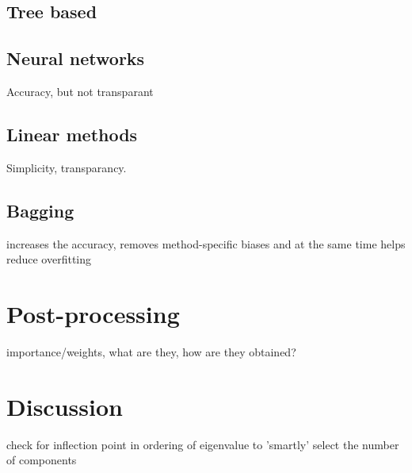 \documentclass[a4paper,10pt]{article}
\begin{document}
\subsection{Tree based}


\subsection{Neural networks}

Accuracy, but not transparant

\subsection{Linear methods}

Simplicity, transparancy.

\subsection{Bagging}

increases the accuracy, removes method-specific biases and at the same time helps reduce overfitting

\section{Post-processing}

importance/weights, what are they, how are they obtained?

\section{Discussion}

\begin{item}
\item check for inflection point in ordering of eigenvalue to 'smartly' select the number of components
\end{item}
\end{document}
